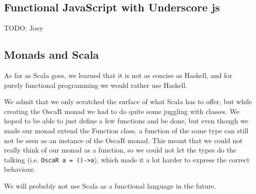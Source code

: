 \documentclass[a4paper]{article}
\begin{document}
\subsection{Functional JavaScript with Underscore js}
{\Large TODO:} Joey

\subsection{Monads and Scala}
As far as Scala goes, 
we learned that it is not as concise as Haskell,
and for purely functional programming we would rather use Haskell.

We admit that we only scratched the surface of what Scala has to offer,
but while creating the OscaR monad we had to do quite some juggling with classes.
We hoped to be able to just define a few functions and be done, 
but even though we made our monad extend the Function class,
a function of the same type can still not be seen as an instance of the OscaR monad.
This meant that we could not really think of our monad as a function,
so we could not let the types do the talking (i.e. \verb|OscaR a = ()->a|),
which made it a lot harder to express the correct behaviour.

We will probably not use Scala as a functional language in the future.

\printbibliography
\end{document}
